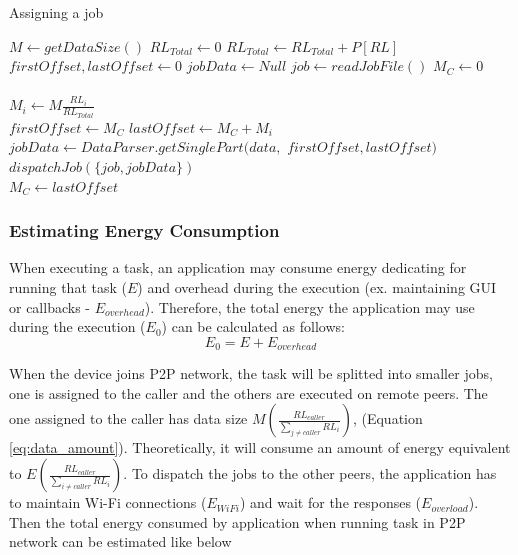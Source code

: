 \documentclass{sig-alternate}
\begin{document}
\begin{algorithm}
\caption{Assigning a job}
\label{alg:assign_job}
\begin{algorithmic}[1]
\begin{scriptsize}
\State $M \leftarrow {getDataSize()}$
\State $RL_{Total} \leftarrow 0$ 
  \State $RL_{Total} \leftarrow RL_{Total} + P[RL]$
\EndFor
\\
\State $firstOffset, lastOffset \leftarrow 0$
\State $jobData \leftarrow Null$
\State $job \leftarrow {readJobFile()}$
\State $M_{C} \leftarrow 0$
\\
\\
  \State $M_{i} \leftarrow M\frac{RL_{i}}{RL_{Total}}$\\
  \State $firstOffset \leftarrow M_{C} $
  \State $lastOffset \leftarrow M_{C} + M_{i}$
  \State $jobData \leftarrow DataParser.getSinglePart(data,$
  \State 
		\hspace{\algorithmicindent}
		\hspace{\algorithmicindent}
		\hspace{\algorithmicindent}
		\hspace{\algorithmicindent}
		\hspace{\algorithmicindent}
						$firstOffset, lastOffset)$
  \State $dispatchJob(\{job, jobData\})$\\
  \State $M_{C} \leftarrow lastOffset$
  
\EndFor

\EndFunction
\end{scriptsize}
\end{algorithmic}
\end{algorithm}

\subsubsection{Estimating Energy Consumption}
When executing a task, an application may consume energy dedicating for running that task ($E$) and overhead during the execution (ex. maintaining GUI or callbacks - $E_{overhead}$). Therefore, the total energy the application may use during the execution ($E_{0}$) can be calculated as follows:
$$E_{0} = E + E_{overhead}$$

When the device joins P2P network, the task will be splitted into smaller jobs, one is assigned to the caller and the others are executed on remote peers. The one assigned to the caller has data size $M(\frac{RL_{caller}}{\sum_{j \neq caller}{RL_{i}}})$, (Equation \ref{eq:data_amount}). Theoretically, it will consume an amount of energy equivalent to $E(\frac{RL_{caller}}{\sum_{i \neq caller}{RL_{i}}})$. To dispatch the jobs to the other peers, the application has to maintain Wi-Fi connections ($E_{WiFi}$) and wait for the responses ($E_{overload}$). Then the total energy consumed by application when running task in P2P network can be estimated like below
\end{document}

